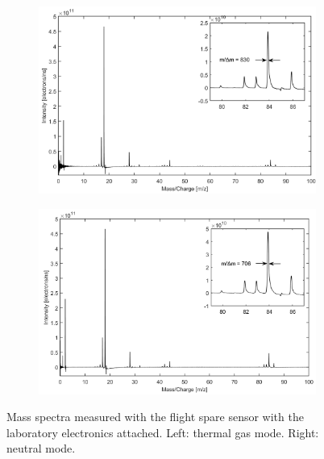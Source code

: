		\begin{figure}[h]
			\begin{subfigure}{0.5\textwidth}
				\centering
				\includegraphics[width = \textwidth]{Experiments/FSLabthMode.png}
			\end{subfigure}
			\begin{subfigure}{0.5\textwidth}
				\centering
				\includegraphics[width = \textwidth]{Experiments/FSLabnMode.png}
			\end{subfigure}
			\caption{Mass spectra measured with the flight spare sensor with the laboratory electronics attached. Left: thermal gas mode. Right: neutral mode.}
			\label{fig:ExpFSFlightSenMassRes}
		\end{figure}

